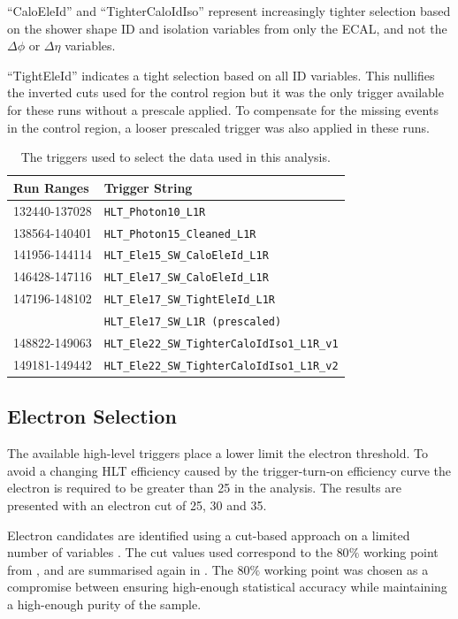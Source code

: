 ``CaloEleId'' and ``TighterCaloIdIso'' represent increasingly tighter selection
based on the shower shape ID and isolation variables from only the {ECAL},
and not the $\Delta\phi$ or $\Delta\eta$ variables.  


``TightEleId'' indicates a tight selection based on all ID variables. 
This nullifies the inverted cuts used for the control region but
it was the only trigger available for these runs without a prescale applied.
To compensate for the missing events in the control region, a looser prescaled
trigger was also applied in these runs.

\begin{table}[htbp]
  \centering
  \begin{tabular}{ l l }
    \toprule
    Run Ranges & Trigger String\\
    \midrule
    132440-137028 & \verb=HLT_Photon10_L1R= \\
    138564-140401 & \verb=HLT_Photon15_Cleaned_L1R= \\
    141956-144114 & \verb=HLT_Ele15_SW_CaloEleId_L1R= \\
    146428-147116 & \verb=HLT_Ele17_SW_CaloEleId_L1R= \\
    147196-148102 & \verb=HLT_Ele17_SW_TightEleId_L1R= \\
                  & \verb=HLT_Ele17_SW_L1R (prescaled)= \\ 
    148822-149063 & \verb=HLT_Ele22_SW_TighterCaloIdIso1_L1R_v1= \\
    149181-149442 & \verb=HLT_Ele22_SW_TighterCaloIdIso1_L1R_v2= \\
    \bottomrule
  \end{tabular}
  \caption{The triggers used to select the data used in this analysis.}
  \label{tab:triggers}
\end{table}

\subsection{Electron Selection}
The available high-level triggers place a lower limit the electron \pT
threshold.
To avoid a changing HLT efficiency caused by the trigger-turn-on efficiency
curve the electron \PT is required to be
greater than \unit{25}{\GeV} in the analysis. 
The results are presented with an electron \pT cut of 25, 30
and \unit{35}{\GeV}.

Electron candidates are identified using a cut-based approach on a limited
number of variables \cite{daskalakis2009data}.  The cut values used correspond
to the $80\%$ working point from , and are summarised
again in . The $80\%$ working point was chosen
as a compromise between ensuring high-enough statistical accuracy while maintaining
a high-enough purity of the sample.

